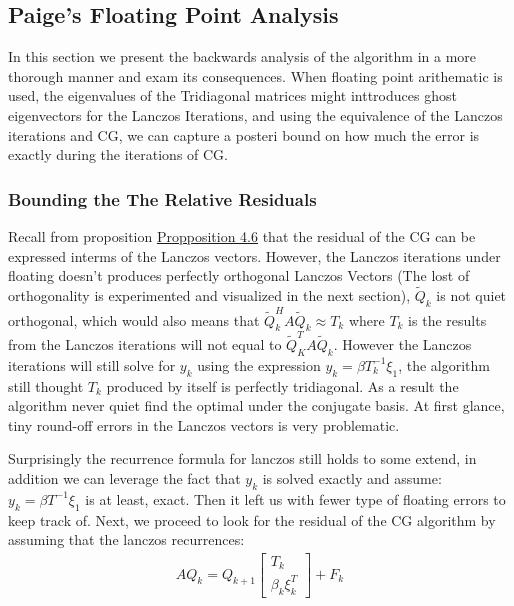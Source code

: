 \documentclass[]{article}
\theoremstyle{definition}
\begin{document}
    \subsection{Paige's Floating Point Analysis}
        In this section we present the backwards analysis of the algorithm in a more thorough manner and exam its consequences. When floating point arithematic is used, the eigenvalues of the Tridiagonal matrices might inttroduces ghost eigenvectors for the Lanczos Iterations, and using the equivalence of the Lanczos iterations and CG, we can capture a posteri bound on how much the error is exactly during the iterations of CG. 
        \subsubsection{Bounding the The Relative Residuals}
            Recall from proposition \hyperref[prop:Lanczos_Vectors_and_Residuals]{Propposition 4.6} that the residual of the CG can be expressed interms of the Lanczos vectors. However, the Lanczos iterations under floating doesn't produces perfectly orthogonal Lanczos Vectors (The lost of orthogonality is experimented and visualized in the next section), $\tilde{Q}_k$ is not quiet orthogonal, which would also means that $\tilde{Q}_k^HA\tilde{Q}_k\approx T_k$ where $T_k$ is the results from the Lanczos iterations will not equal to $\tilde{Q}^T_KA\tilde{Q}_k$. However the Lanczos iterations will still solve for $y_k$ using the expression $y_k = \beta T^{-1}_k\xi_1$, the algorithm still thought $T_k$ produced by itself is perfectly tridiagonal. As a result the algorithm never quiet find the optimal under the conjugate basis. At first glance, tiny round-off errors in the Lanczos vectors is very problematic. 
            \par
            Surprisingly the recurrence formula for lanczos still holds to some extend, in addition we can leverage the fact that $y_k$ is solved exactly and assume: $y_k = \beta T^{-1}\xi_1$ is at least, exact. Then it left us with fewer type of floating errors to keep track of. Next, we proceed to look for the residual of the CG algorithm by assuming that the lanczos recurrences: 
            \begin{align}
                AQ_k = Q_{k + 1} \begin{bmatrix}
                    T_k
                    \\
                    \beta_k \xi_k^T
                \end{bmatrix} + F_k
            \end{align}
\end{document}
